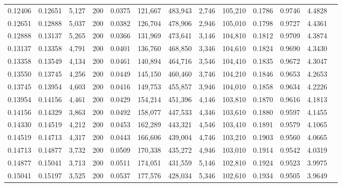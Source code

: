 \begin{tabular}{rrrrrrrrrrrrr}
0.12406 & 0.12651 &  5,127 & 200 &                                     0.0375 & 121,667 & 483,943 &   2,746 & 105,210 & 0.1786 & 0.9746 & 4.4828 \\
0.12651 & 0.12888 &  5,037 & 200 &                                     0.0382 & 126,704 & 478,906 &   2,946 & 105,010 & 0.1798 & 0.9727 & 4.4361 \\
0.12888 & 0.13137 &  5,265 & 200 &                                     0.0366 & 131,969 & 473,641 &   3,146 & 104,810 & 0.1812 & 0.9709 & 4.3874 \\
0.13137 & 0.13358 &  4,791 & 200 &                                     0.0401 & 136,760 & 468,850 &   3,346 & 104,610 & 0.1824 & 0.9690 & 4.3430 \\
0.13358 & 0.13549 &  4,134 & 200 &                                     0.0461 & 140,894 & 464,716 &   3,546 & 104,410 & 0.1835 & 0.9672 & 4.3047 \\
0.13550 & 0.13745 &  4,256 & 200 &                                     0.0449 & 145,150 & 460,460 &   3,746 & 104,210 & 0.1846 & 0.9653 & 4.2653 \\
0.13745 & 0.13954 &  4,603 & 200 &                                     0.0416 & 149,753 & 455,857 &   3,946 & 104,010 & 0.1858 & 0.9634 & 4.2226 \\
0.13954 & 0.14156 &  4,461 & 200 &                                     0.0429 & 154,214 & 451,396 &   4,146 & 103,810 & 0.1870 & 0.9616 & 4.1813 \\
0.14156 & 0.14329 &  3,863 & 200 &                                     0.0492 & 158,077 & 447,533 &   4,346 & 103,610 & 0.1880 & 0.9597 & 4.1455 \\
0.14330 & 0.14519 &  4,212 & 200 &                                     0.0453 & 162,289 & 443,321 &   4,546 & 103,410 & 0.1891 & 0.9579 & 4.1065 \\
0.14519 & 0.14713 &  4,317 & 200 &                                     0.0443 & 166,606 & 439,004 &   4,746 & 103,210 & 0.1903 & 0.9560 & 4.0665 \\
0.14713 & 0.14877 &  3,732 & 200 &                                     0.0509 & 170,338 & 435,272 &   4,946 & 103,010 & 0.1914 & 0.9542 & 4.0319 \\
0.14877 & 0.15041 &  3,713 & 200 &                                     0.0511 & 174,051 & 431,559 &   5,146 & 102,810 & 0.1924 & 0.9523 & 3.9975 \\
0.15041 & 0.15197 &  3,525 & 200 &                                     0.0537 & 177,576 & 428,034 &   5,346 & 102,610 & 0.1934 & 0.9505 & 3.9649 \\

\end{tabular}
